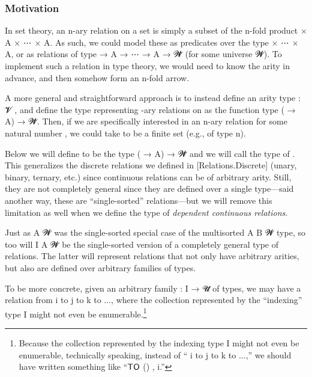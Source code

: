 
\subsubsection{Motivation}\label{sec:motivation-1}
In set theory, an \ab n-ary relation on a set  is simply a subset of the \ab n-fold product  \ad × \ab A \ad × \as ⋯ \ad × \ab A. As such, we could model these as predicates over the type  \ad × \as ⋯ \ad × \ab A, or as relations of type  \as → \ab A \as → \as ⋯ \as → \ab A \as → \ab 𝓦\af ̇ (for some universe \ab 𝓦). To implement such a relation in type theory, we would need to know the arity in advance, and then somehow form an \ab n-fold arrow.

A more general and straightforward approach is to instead define an arity type  \as : \ab 𝓥\af ̇ , and define the type representing -ary relations on  as the function type ( \as → \ab A) \as → \ab 𝓦\af ̇. Then, if we are specifically interested in an \ab n-ary relation for some natural number , we could take  to be a finite set (e.g., of type  n).

Below we will define  to be the type ( \as → \ab A) \as → \ab 𝓦\af ̇ and we will call  the type of . This generalizes the discrete relations we defined in [Relations.Discrete] (unary, binary, ternary, etc.) since continuous relations can be of arbitrary arity.  Still, they are not completely general since they are defined over a single type---said another way, these are ``single-sorted'' relations---but we will remove this limitation as well when we define the type of \emph{dependent continuous relations}.

Just as  \ab A \ab 𝓦 was the single-sorted special case of the multisorted  \ab A \ab B \ab 𝓦 type, so too will  \ab I \ab A \ab 𝓦 be the single-sorted version of a completely general type of relations. The latter will represent relations that not only have arbitrary arities, but also are defined over arbitrary families of types.

To be more concrete, given an arbitrary family  \as : \ab I \as → \ab 𝓤\af ̇ of types, we may have a relation from  \ab i to  \ab j to  \ab k to $\ldots$, where the collection represented by the ``indexing'' type \ab I might not even be enumerable.\footnote{Because the collection represented by the indexing type \ab I might not even be enumerable, technically speaking, instead of `` \ab i to  \ab j to  \ab k to $\ldots$,'' we should have written something like ``$\mathsf{\af{TO}}$ () ,  \ab i.''}

